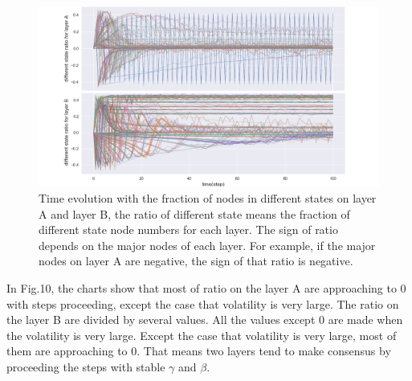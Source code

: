 \documentclass[english]{cccconf}
\begin{document}
\begin{figure}[!htb]
  \centering
  \includegraphics[width=\hsize]{FIG10.png}
  \caption{Time evolution with the fraction of nodes in different states on layer A and layer B, the ratio of different state means the fraction of different state node numbers for each layer. The sign of ratio depends on the major nodes of each layer. For example, if the major nodes on layer A are negative, the sign of that ratio is negative.}
  \label{Fig10}
\end{figure}
In Fig.10, the charts show that most of ratio on the layer A are approaching to 0 with steps proceeding, except the case that volatility is very large. The ratio on the layer B are divided by several values. All the values except 0 are made when the volatility is very large. Except the case that volatility is very large, most of them are approaching to 0. That means two layers tend to make consensus by proceeding the steps with stable $\gamma$ and $\beta$.
\end{document}
